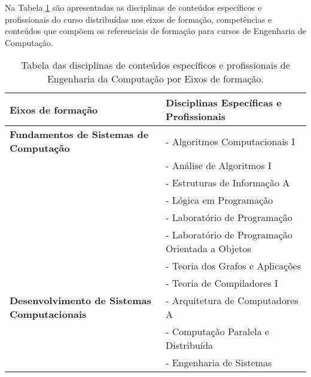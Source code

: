 Na Tabela \ref{tab:areas} são apresentadas as disciplinas de conteúdos específicos e profissionais do curso distribuídas nos eixos de formação, competências e conteúdos que compõem os referenciais de formação para cursos de Engenharia de Computação.




\begin{table}[ht]

\centering

\caption{Tabela das disciplinas de conteúdos específicos e profissionais de Engenharia da Computação por Eixos de formação.}

\label{tab:areas}

\begin{tabular}{l l}
    
    \hline
    
    {\bf Eixos de formação} & {\bf Disciplinas Específicas e Profissionais} \\
    
    \hline
    
    \textbf{Fundamentos de Sistemas de Computação} 
    & - Algoritmos Computacionais I \\ 
    
    & - Análise de Algoritmos I \\ 
    
    & - Estruturas de Informação A \\ 
    
    & - Lógica em Programação \\ 
    
    & - Laboratório de Programação \\ 
    
    & - Laboratório de Programação Orientada a Objetos \\ 
    
    & - Teoria dos Grafos e Aplicações \\
    
    & - Teoria de Compiladores I \\ \hline
    
    \textbf{Desenvolvimento de Sistemas Computacionais} 
    & - Arquitetura de Computadores A \\ 
    
    & - Computação Paralela e Distribuída \\ 
    
    & - Engenharia de Sistemas \\ 
    

\end{tabular}
\end{table}
